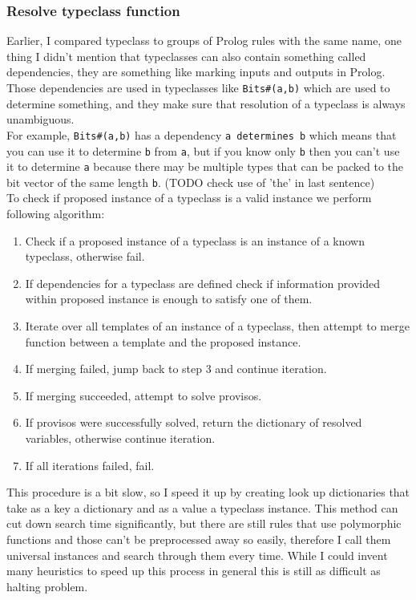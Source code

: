 \documentclass[14pt]{report}
\begin{document}
\subsubsection{Resolve typeclass function}
Earlier, I compared typeclass to groups of Prolog rules with the same name, one thing I didn't mention that typeclasses can also contain something called dependencies, they are something like marking inputs and outputs in Prolog. Those dependencies are used in typeclasses like \verb!Bits#(a,b)! which are used to determine something, and they make sure that resolution of a typeclass is always unambiguous. \\
For example, \verb!Bits#(a,b)! has a dependency \verb!a determines b! which means that you can use it to determine \verb!b! from \verb!a!, but if you know only \verb!b! then you can't use it to determine \verb!a! because there may be multiple types that can be packed to the bit vector of the same length \verb!b!. (TODO check use of 'the' in last sentence)
\\  
To check if proposed instance of a typeclass is a valid instance we perform following algorithm:
\begin{enumerate}
    \item Check if a proposed instance of a typeclass is an instance of a known typeclass, otherwise fail.
    \item If dependencies for a typeclass are defined check if information provided within proposed instance is enough to satisfy one of them.
    \item Iterate over all templates of an instance of a typeclass, then attempt to merge function between a template and the proposed instance. 
    \item If merging failed, jump back to step 3 and continue iteration.
    \item If merging succeeded, attempt to solve provisos.
    \item If provisos were successfully solved, return the dictionary of resolved variables, otherwise continue iteration.
    \item If all iterations failed, fail.
\end{enumerate}
This procedure is a bit slow, so I speed it up by creating look up dictionaries that take as a key a dictionary and as a value a typeclass instance. This method can cut down search time significantly, but there are still rules that use polymorphic functions and those can't be preprocessed away so easily, therefore I call them universal instances and search through them every time. While I could invent many heuristics to speed up this process in general this is still as difficult as halting problem.
\end{document}

